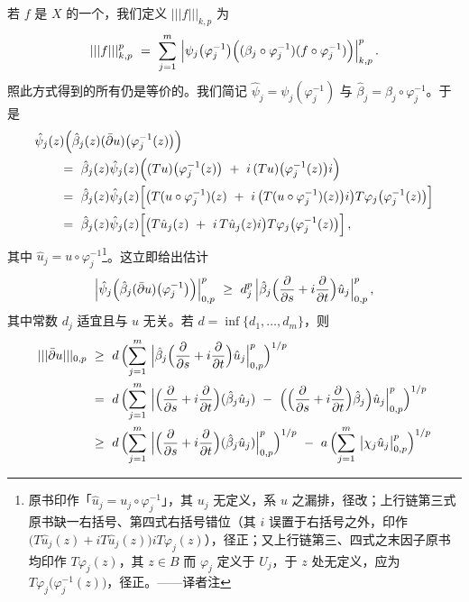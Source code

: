 若 $f$ 是 $X$ 的一个\trSection，我们定义\trNorm{} $\vert\vert\vert f\vert\vert\vert_{k,p}$ %
为
\[
\vert\vert\vert f\vert\vert\vert_{k,p}^{p}\ =\ \sum_{j=1}^{m}\ \Bigl|\psi_{j}\bigl(\varphi_{j}^{-1}\bigr)\Bigl((\beta_{j}\circ\varphi_{j}^{-1})(f\circ\varphi_{j}^{-1})\Bigr)\Bigr|_{k,p}^{p}\,.
\]
照此方式得到的所有\trNorm{}仍是等价的。我们简记 $\hat{\psi}_{j}=\psi_{j}(\varphi_{j}^{-1})$ %
与 $\hat{\beta}_{j}=\beta_{j}\circ\varphi_{j}^{-1}$。于是
\begin{align*}
&\hat{\psi}_{j}(z)\Bigl(\hat{\beta}_{j}(z)(\bar{\partial}u)\bigl(\varphi_{j}^{-1}(z)\bigr)\Bigr)\\
&\qquad=\ \hat{\beta}_{j}(z)\hat{\psi}_{j}(z)\Bigl((Tu)\bigl(\varphi_{j}^{-1}(z)\bigr)\ +\ i\,(Tu)\bigl(\varphi_{j}^{-1}(z)\bigr)i\Bigr)\\
&\qquad=\ \hat{\beta}_{j}(z)\hat{\psi}_{j}(z)\Bigl[\bigl(T(u\circ\varphi_{j}^{-1})(z)\ +\ i\,\bigl(T(u\circ\varphi_{j}^{-1})(z)\bigr)i\bigr)T\varphi_{j}\bigl(\varphi_{j}^{-1}(z)\bigr)\Bigr]\\
&\qquad=\ \hat{\beta}_{j}(z)\hat{\psi}_{j}(z)\Bigl[\bigl(T\hat{u}_{j}(z)\ +\ i\,T\hat{u}_{j}(z)i\bigr)T\varphi_{j}\bigl(\varphi_{j}^{-1}(z)\bigr)\Bigr]\,,
\end{align*}
其中 $\hat{u}_{j}=u\circ\varphi_{j}^{-1}$\footnote{原书印作「$\hat{u}_{j}=u_{j}\circ\varphi_{j}^{-1}$」，其 $u_{j}$ 无定义，系 $u$ 之漏排，径改；上行链第三式原书缺一右括号、第四式右括号错位（其 $i$ 误置于右括号之外，印作 $\bigl(T\hat{u}_{j}(z)+iT\hat{u}_{j}(z)\bigr)iT\varphi_{j}(z)$），径正；又上行链第三、四式之末因子原书均印作 $T\varphi_{j}(z)$，其 $z\in B$ 而 $\varphi_{j}$ 定义于 $U_{j}$，于 $z$ 处无定义，应为 $T\varphi_{j}\bigl(\varphi_{j}^{-1}(z)\bigr)$，径正。——译者注}。这立即给出估计
\[
\Bigl|\hat{\psi}_{j}\Bigl(\hat{\beta}_{j}(\bar{\partial}u)\bigl(\varphi_{j}^{-1}\bigr)\Bigr)\Bigr|_{0,p}^{p}\ \geq\ d_{j}^{p}\,\Bigl|\hat{\beta}_{j}\Bigl(\frac{\partial}{\partial s}+i\frac{\partial}{\partial t}\Bigr)\hat{u}_{j}\Bigr|_{0,p}^{p}\,,
\]
其中常数 $d_{j}$ 适宜且与 $u$ 无关。若 $d=\inf\{d_{1},\ldots,d_{m}\}$，则
\begin{align*}
\vert\vert\vert\bar{\partial}u\vert\vert\vert_{0,p}\ &\geq\ d\,\Bigl(\sum_{j=1}^{m}\ \Bigl|\hat{\beta}_{j}\Bigl(\frac{\partial}{\partial s}+i\frac{\partial}{\partial t}\Bigr)\hat{u}_{j}\Bigr|_{0,p}^{p}\Bigr)^{1/p}\\
&=\ d\,\Bigl(\sum_{j=1}^{m}\ \Bigl|\Bigl(\frac{\partial}{\partial s}+i\frac{\partial}{\partial t}\Bigr)(\hat{\beta}_{j}\hat{u}_{j})\ -\ \Bigl(\Bigl(\frac{\partial}{\partial s}+i\frac{\partial}{\partial t}\Bigr)\hat{\beta}_{j}\Bigr)\hat{u}_{j}\Bigr|_{0,p}^{p}\Bigr)^{1/p}\\
&\geq\ d\,\Bigl(\sum_{j=1}^{m}\ \Bigl|\Bigl(\frac{\partial}{\partial s}+i\frac{\partial}{\partial t}\Bigr)(\hat{\beta}_{j}\hat{u}_{j})\Bigr|_{0,p}^{p}\Bigr)^{1/p}\ -\ a\,\Bigl(\sum_{j=1}^{m}\ \bigl|\chi_{j}\hat{u}_{j}\bigr|_{0,p}^{p}\Bigr)^{1/p}
\end{align*}
